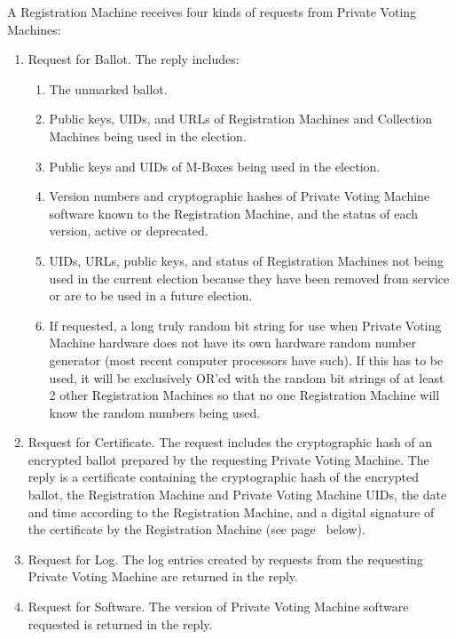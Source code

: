 \documentclass[12pt]{article}
\newcommand{\pagref}[1]{(see page~\pageref{#1} below)}
\begin{document}
A Registration Machine receives four kinds of requests from
Private Voting Machines:
\begin{enumerate}

\item
Request for Ballot.  The reply includes:
\begin{enumerate}
\item The unmarked ballot.
\item Public keys, UIDs, and URLs
      of Registration Machines and Collection Machines being used
      in the election.
\item Public keys and UIDs of M-Boxes being used in the election.
\item Version numbers and cryptographic hashes
      of Private Voting Machine software
      known to the Registration Machine, and
      the status of each version, active or deprecated.
\item UIDs, URLs, public keys, and status of Registration Machines not
      being used in the current election because they have been removed
      from service or are to be used in a future election.
\item If requested, a long truly random bit string for use when
      Private Voting Machine hardware does not have its own hardware
      random number generator (most recent computer processors have
      such).  If this has to be used, it will be exclusively OR'ed with
      the random bit strings of at least 2 other Registration Machines
      so that no one Registration Machine will know the random numbers being
      used.
\end{enumerate}

\item
Request for Certificate.  The request includes the cryptographic hash
of an encrypted ballot prepared by the requesting Private
Voting Machine.  The reply is a certificate containing
the cryptographic hash of the encrypted ballot,
the Registration Machine and Private Voting Machine UIDs,
the date and time according to the Registration Machine,
and a digital signature of the certificate by the Registration Machine
\pagref{CERTIFICATE-DETAILS}.

\item
Request for Log.  The log entries created by requests from the
requesting Private Voting Machine are returned in the reply.

\item
Request for Software.  The version of Private Voting Machine software
requested is returned in the reply.

\end{enumerate}
\end{document}
